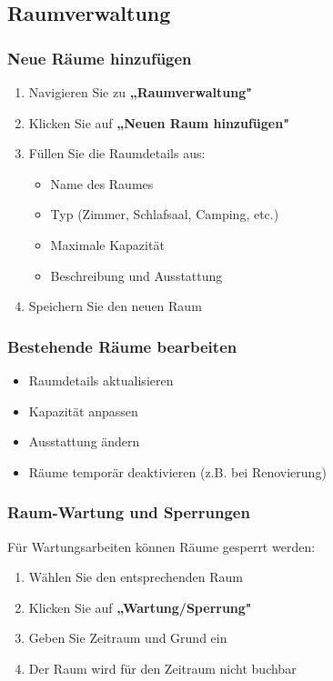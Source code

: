 \subsection{Raumverwaltung}

\subsubsection{Neue Räume hinzufügen}

\begin{enumerate}
    \item Navigieren Sie zu \textbf{„Raumverwaltung"}
    \item Klicken Sie auf \textbf{„Neuen Raum hinzufügen"}
    \item Füllen Sie die Raumdetails aus:
        \begin{itemize}
            \item Name des Raumes
            \item Typ (Zimmer, Schlafsaal, Camping, etc.)
            \item Maximale Kapazität
            \item Beschreibung und Ausstattung
        \end{itemize}
    \item Speichern Sie den neuen Raum
\end{enumerate}

\subsubsection{Bestehende Räume bearbeiten}

\begin{itemize}
    \item Raumdetails aktualisieren
    \item Kapazität anpassen
    \item Ausstattung ändern
    \item Räume temporär deaktivieren (z.B. bei Renovierung)
\end{itemize}

\subsubsection{Raum-Wartung und Sperrungen}

Für Wartungsarbeiten können Räume gesperrt werden:

\begin{enumerate}
    \item Wählen Sie den entsprechenden Raum
    \item Klicken Sie auf \textbf{„Wartung/Sperrung"}
    \item Geben Sie Zeitraum und Grund ein
    \item Der Raum wird für den Zeitraum nicht buchbar
\end{enumerate}

